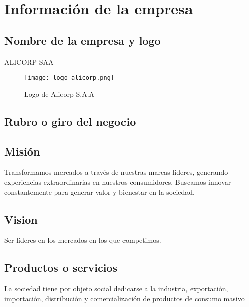 \section{Información de la empresa}

\subsection{Nombre de la empresa y logo}
ALICORP SAA\\
\begin{figure}[!ht]
    \centering
    \texttt{[image: logo\_alicorp.png]}	 
    \caption{Logo de Alicorp S.A.A}
\end{figure}


\subsection{Rubro o giro del negocio}

\subsection{Misión}
Transformamos mercados a través de nuestras marcas líderes, generando experiencias extraordinarias en nuestros consumidores. Buscamos innovar constantemente para generar valor y bienestar en la sociedad.

\subsection{Vision}
Ser líderes en los mercados en los que competimos.
\subsection{Productos o servicios}
La sociedad tiene por objeto social dedicarse a la industria, exportación, importación, distribución y comercialización de productos de consumo masivo

